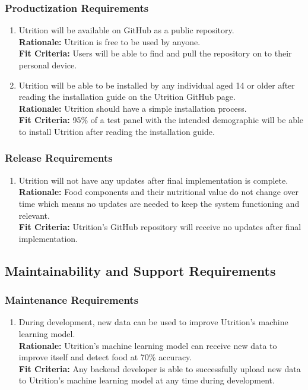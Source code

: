 \documentclass[12pt]{article}
\begin{document}
\subsubsection{Productization Requirements}
\begin{enumerate}[start=1,label={OE\arabic*.}]
	\item Utrition will be available on GitHub as a public repository.\\
	\textbf{Rationale:} Utrition is free to be used by anyone.\\
	\textbf{Fit Criteria:} Users will be able to find and pull the repository on to their personal device.
	\item Utrition will be able to be installed by any individual aged 14 or older after reading the installation guide on the Utrition GitHub page.\\
	\textbf{Rationale:} Utrition should have a simple installation process. \\
	\textbf{Fit Criteria:} 95\% of a test panel with the intended demographic will be able to install Utrition after reading the installation guide.
\end{enumerate}

\subsubsection{Release Requirements}

\begin{enumerate}[{OE}3. ] 
	\item Utrition will not have any updates after final implementation is complete.\\
	\textbf{Rationale:} Food components and their nutritional value do not change over time which means no updates are needed to keep the system functioning and relevant.\\	
	\textbf{Fit Criteria:} Utrition’s GitHub repository will receive no updates after final implementation.
\end{enumerate}

\subsection{Maintainability and Support Requirements}

\subsubsection{Maintenance Requirements}
\begin{enumerate}[{MS}1. ] 
	\item During development, new data can be used to improve Utrition’s machine learning model.\\
	\textbf{Rationale:} Utrition’s machine learning model can receive new data to improve itself and detect food at 70\% accuracy.\\	
	\textbf{Fit Criteria:} Any backend developer is able to successfully upload new data to Utrition’s machine learning model at any time during development. 
\end{enumerate}
\end{document}
